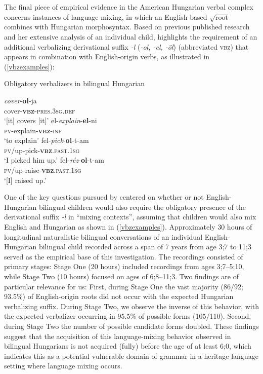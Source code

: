 \documentclass[output=paper,colorlinks,citecolor=brown,footheight=42pt]{langscibook}
\begin{document}
The final piece of empirical evidence in the American Hungarian verbal complex concerns instances of language mixing, in which an English-based $\sqrt{\text{root}}$ combines with Hungarian morphosyntax. Based on previous published research and her extensive analysis of an individual child, \citet{bolonyai05} highlights the requirement of an additional verbalizing derivational suffix \textit{-l} (\textit{-ol, -el, -\"{o}l}) (abbreviated \textsc{vbz}) that appears in combination with English-origin verbs, as illustrated in (\ref{vbzexamples}):

\begin{exe}
\ex \label{vbzexamples} Obligatory verbalizers in bilingual Hungarian \citep[317]{bolonyai05}
\begin{xlist}

\ex \gll \textit{cover}-\textbf{ol}-ja \\
          cover-\textsc{\textbf{vbz}-pres.3sg.def} \\
          \glt `[it] covers [it]' 
\ex \gll el-\textit{explain}-\textbf{el}-ni \\
         \textsc{pv}-explain-\textsc{\textbf{vbz}-inf} \\
         \glt `to explain' 
\ex \gll fel-\textit{pick}-\textbf{ol}-t-am \\
         \textsc{pv}/up-pick-\textsc{\textbf{vbz}.past.1sg} \\
         \glt `I picked him up.' 
\ex \gll fel-\textit{r\'{e}z}-\textbf{ol}-t-am \\
         \textsc{pv}/up-raise-\textsc{\textbf{vbz}.past.1sg} \\
         \glt `[I] raised up.' 

\end{xlist}
\end{exe}

One of the key questions pursued by \citet{bolonyai05} centered on whether or not English-Hungarian bilingual children would also require the obligatory presence of the derivational suffix \textit{-l} in “mixing contexts”, assuming that children would also mix English and Hungarian as shown in (\ref{vbzexamples}). Approximately 30 hours of longitudinal naturalistic bilingual conversations of an individual English-Hungarian bilingual child recorded across a span of 7 years from age 3;7 to 11;3 served as the empirical base of this investigation. The recordings consisted of primary stages: Stage One (20 hours) included recordings from ages 3;7–5;10, while Stage Two (10 hours) focused on ages of 6;8–11;3. Two findings are of particular relevance for us: First, during Stage One the vast majority (86/92; 93.5\%) of English-origin roots did not occur with the expected Hungarian verbalizing suffix. During Stage Two, we observe the inverse of this behavior, with the expected verbalizer occurring in 95.5\% of possible forms (105/110). Second, during Stage Two the number of possible candidate forms doubled. These findings suggest that the acquisition of this language-mixing behavior observed in bilingual Hungarians is not acquired (fully) before the age of at least 6;0, which indicates this as a potential vulnerable domain of grammar in a heritage language setting where language mixing occurs.
\end{document}

